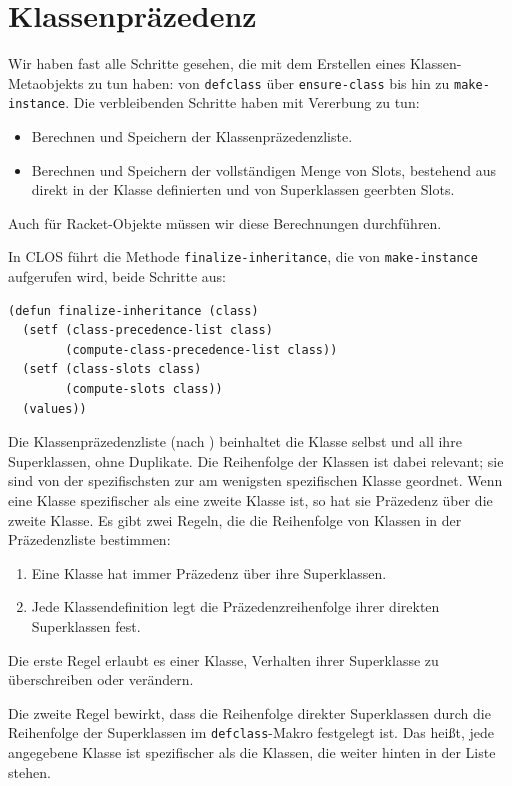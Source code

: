\section{Klassenpräzedenz}
\label{cpl}
Wir haben fast alle Schritte gesehen, die mit dem Erstellen eines Klassen-Metaobjekts zu tun haben: von \texttt{defclass} über \texttt{ensure-class} bis hin zu \texttt{make-instance}. Die verbleibenden Schritte haben mit Vererbung zu tun:
\begin{itemize}
 \item Berechnen und Speichern der Klassenpräzedenzliste.
 \item Berechnen und Speichern der vollständigen Menge von Slots, bestehend aus direkt in der Klasse definierten und von Superklassen geerbten Slots.
\end{itemize}

Auch für Racket-Objekte müssen wir diese Berechnungen durchführen.

In CLOS führt die Methode \texttt{finalize-inheritance}, die von \texttt{make-instance} aufgerufen wird, beide Schritte aus:

\begin{lstlisting}
(defun finalize-inheritance (class)
  (setf (class-precedence-list class)
        (compute-class-precedence-list class))
  (setf (class-slots class)
        (compute-slots class))
  (values))
\end{lstlisting}

Die Klassenpräzedenzliste (nach \cite[S. 118ff]{keene}) beinhaltet die Klasse selbst und all ihre Superklassen, ohne Duplikate. Die Reihenfolge der Klassen ist dabei relevant; sie sind von der spezifischsten zur am wenigsten spezifischen Klasse geordnet. Wenn eine Klasse spezifischer als eine zweite Klasse ist, so hat sie Präzedenz über die zweite Klasse. Es gibt zwei Regeln, die die Reihenfolge von Klassen in der Präzedenzliste bestimmen:

\begin{enumerate}
 \item Eine Klasse hat immer Präzedenz über ihre Superklassen.
 \item Jede Klassendefinition legt die Präzedenzreihenfolge ihrer direkten Superklassen fest.
\end{enumerate}

Die erste Regel erlaubt es einer Klasse, Verhalten ihrer Superklasse zu überschreiben oder verändern.

Die zweite Regel bewirkt, dass die Reihenfolge direkter Superklassen durch die Reihenfolge der Superklassen im \texttt{defclass}-Makro festgelegt ist. Das heißt, jede angegebene Klasse ist spezifischer als die Klassen, die weiter hinten in der Liste stehen.

